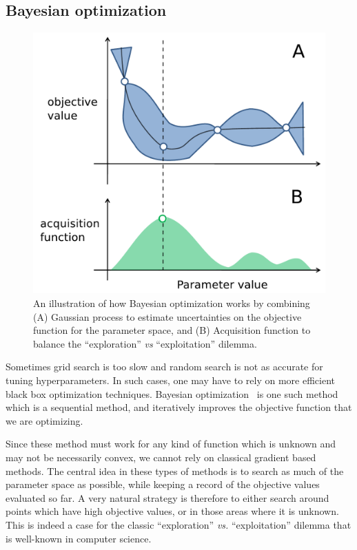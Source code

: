 \subsection{Bayesian optimization}


\begin{figure}[htb]
\begin{center}
   \includegraphics[width=0.7\linewidth]{figures/bayes_opt.pdf}
\end{center}
   \caption[Bayesian optimization for parameter tuning]{An illustration of how Bayesian optimization works by combining (A) Gaussian process to estimate uncertainties on the objective function for the parameter space, and (B) Acquisition function to balance the ``exploration'' \emph{vs} ``exploitation'' dilemma.}
   \label{fig:bayes_opt}
\end{figure}

Sometimes grid search is too slow and random search is not as accurate for tuning hyperparameters. In such cases, one may have to rely on more efficient black box optimization techniques. Bayesian optimization~\citep{snoek2012practical} is one such method which is a sequential method, and iteratively improves the objective function that we are optimizing.

Since these method must work for any kind of function which is unknown and may not be necessarily convex, we cannot rely on classical gradient based methods. The central idea in these types of methods is to search as much of the parameter space as possible, while keeping a record of the objective values evaluated so far. A very natural strategy is therefore to either search around points which have high objective values, or in those areas where it is unknown. This is indeed a case for the classic  ``exploration'' \emph{vs.} ``exploitation'' dilemma that is well-known in computer science.

